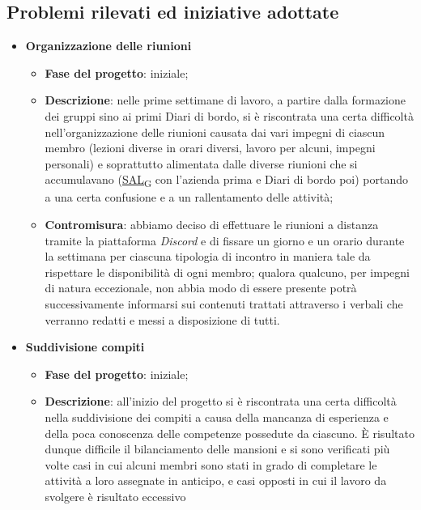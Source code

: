 \subsection{Problemi rilevati ed iniziative adottate}
\begin{itemize}
    \item \textbf{Organizzazione delle riunioni}
    \begin{itemize}
        \item \textbf{Fase del progetto}: iniziale;
        \item \textbf{Descrizione}: nelle prime settimane di lavoro, a partire dalla formazione dei gruppi sino ai primi Diari di bordo, 
        si è riscontrata una certa difficoltà nell'organizzazione delle riunioni causata dai vari impegni di ciascun membro 
        (lezioni diverse in orari diversi, lavoro per alcuni, impegni personali) e soprattutto alimentata dalle diverse riunioni che si 
        accumulavano (\href{https://7last.github.io/docs/rtb/documentazione-interna/glossario\#stato-avanzamento-lavori}{SAL\textsubscript{G}} con l'azienda prima e Diari di bordo poi) portando a una certa confusione e a un 
        rallentamento delle attività;
        \item \textbf{Contromisura}: abbiamo deciso di effettuare le riunioni a distanza tramite la piattaforma \textit{Discord} 
        e di fissare un giorno e un orario durante la settimana per ciascuna tipologia di incontro in maniera tale da
        rispettare le disponibilità di ogni membro;
        qualora qualcuno, per impegni di natura eccezionale, non abbia modo di essere presente potrà successivamente informarsi sui 
        contenuti trattati attraverso i verbali che verranno redatti e messi a disposizione di tutti.
    \end{itemize}
    \item \textbf{Suddivisione compiti}
    \begin{itemize}
        \item \textbf{Fase del progetto}: iniziale;
        \item \textbf{Descrizione}: all'inizio del progetto si è riscontrata una certa difficoltà nella suddivisione dei 
        compiti a causa della mancanza di esperienza e della poca conoscenza delle competenze possedute da ciascuno. È risultato dunque 
        difficile il bilanciamento delle mansioni e si sono verificati più volte casi in cui alcuni membri sono stati in grado di completare
        le attività a loro assegnate in anticipo, e casi opposti in cui il lavoro da svolgere è risultato eccessivo

\end{itemize}
\end{itemize}
